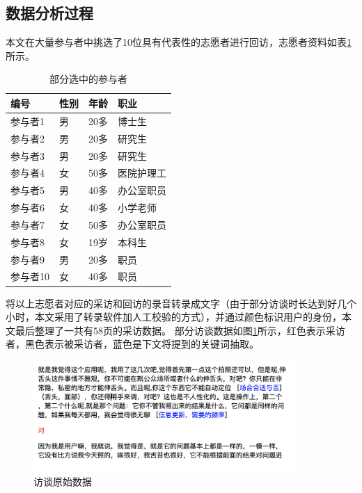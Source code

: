 


\subsection{数据分析过程}

本文在大量参与者中挑选了10位具有代表性的志愿者进行回访，志愿者资料如表\ref{tab:part}所示。
\begin{table}[htb]
    \centering
    \caption{部分选中的参与者}
    \begin{tabular}{llll}
          \toprule
          编号 &	性别 &	年龄 &	职业 \\
          \midrule
          参与者1 &	男 &	20多 &	博士生 \\
          参与者2 &	男 &	20多 &	研究生 \\
          参与者3 &	男 &	20多 &	研究生 \\
          参与者4 &	女 &	50多 &	医院护理工 \\
          参与者5 &	男 &	40多 &	办公室职员 \\
          参与者6 &	女 &	40多 &	小学老师 \\
          参与者7 &	女 &	50多 &	办公室职员 \\
          参与者8 &	女 &	19岁 &	本科生 \\
          参与者9 &	男 &	20多 &	职员 \\
          参与者10 &	女 &	40多 &	职员 \\
          \bottomrule
    \end{tabular}
    \label{tab:part}
\end{table}
将以上志愿者对应的采访和回访的录音转录成文字（由于部分访谈时长达到好几个小时，本文采用了转录软件加人工校验的方式），并通过颜色标识用户的身份，本文最后整理了一共有58页的采访数据。
部分访谈数据如图\ref{fig:datas}所示，红色表示采访者，黑色表示被采访者，蓝色是下文将提到的关键词抽取。

\begin{figure}[htb]
    \centering
    \includegraphics[width=10cm]{images/data.png}
    \caption{访谈原始数据}
    \label{fig:datas}
\end{figure}




